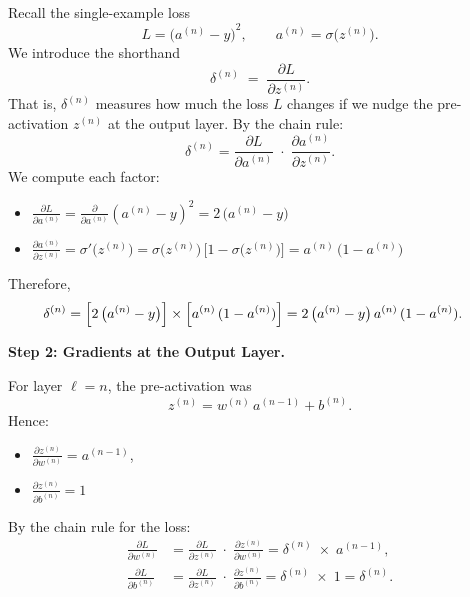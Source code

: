 \documentclass{article}
\begin{document}
Recall the single-example loss
\[
    L 
    = {\bigl(a^{(n)} - y\bigr)}^2,
    \qquad
    a^{(n)} = \sigma\bigl(z^{(n)}\bigr).
\]
We introduce the shorthand
\[
    \delta^{(n)} \;=\; \frac{\partial L}{\partial z^{(n)}}.
\]
That is, \(\delta^{(n)}\) measures how much the loss \(L\) changes if we nudge the pre-activation \(z^{(n)}\) at the output layer.  By the chain rule:
\[
    \delta^{(n)} 
    = \frac{\partial L}{\partial a^{(n)}} 
      \;\cdot\; \frac{\partial a^{(n)}}{\partial z^{(n)}}.
\]
We compute each factor:
\begin{itemize}
    \item \(\displaystyle \frac{\partial L}{\partial a^{(n)}} 
      = \frac{\partial}{\partial a^{(n)}} {(a^{(n)} - y)}^2 
      = 2\,\bigl(a^{(n)} - y\bigr)\)
    \item \(\displaystyle \frac{\partial a^{(n)}}{\partial z^{(n)}} 
      = \sigma'\bigl(z^{(n)}\bigr) 
      = \sigma\bigl(z^{(n)}\bigr)\,\bigl[1 - \sigma\bigl(z^{(n)}\bigr)\bigr] 
      = a^{(n)}\,\bigl(1 - a^{(n)}\bigr)\)
\end{itemize}
Therefore,
\begin{align}
    \delta^{(n)} 
    &= \Bigl[2\,\bigl(a^{(n)} - y\bigr)\Bigr] 
       \times \Bigl[a^{(n)}\,(1 - a^{(n)})\Bigr] 
    = 2\,\bigl(a^{(n)} - y\bigr)\,a^{(n)}\,(1 - a^{(n)}).
    \label{eq:delta-output}
\end{align}

\vspace{0.5em}
\noindent \textbf{Step 2: Gradients at the Output Layer.}

For layer \(\ell = n\), the pre-activation was
\[
    z^{(n)} = w^{(n)}\,a^{(n-1)} + b^{(n)}.
\]
Hence:
\begin{itemize}
    \item \(\displaystyle \frac{\partial z^{(n)}}{\partial w^{(n)}} 
       = a^{(n-1)}\),
    \item \(\displaystyle \frac{\partial z^{(n)}}{\partial b^{(n)}} 
       = 1\)
\end{itemize}
By the chain rule for the loss:
\begin{align}
    \frac{\partial L}{\partial w^{(n)}} 
    &= \frac{\partial L}{\partial z^{(n)}} 
       \;\cdot\; \frac{\partial z^{(n)}}{\partial w^{(n)}} 
    = \delta^{(n)} \;\times\; a^{(n-1)},
    \label{eq:grad-wn} 
    \\
    \frac{\partial L}{\partial b^{(n)}} 
    &= \frac{\partial L}{\partial z^{(n)}} 
       \;\cdot\; \frac{\partial z^{(n)}}{\partial b^{(n)}} 
    = \delta^{(n)} \;\times\; 1 
    = \delta^{(n)}.
    \label{eq:grad-bn} 
\end{align}
\end{document}
